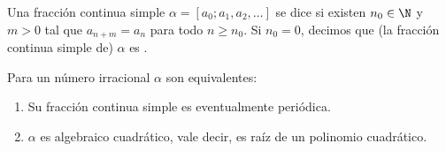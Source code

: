 \documentclass[teoria-numeros.tex]{subfiles}
\begin{document}
\begin{mydef}
	Una fracción continua simple $\alpha = [a_0; a_1, a_2, \dots]$ se dice 
	si existen $n_0 \in \N$ y $m > 0$ tal que $a_{n + m} = a_n$ para todo $n \ge n_0$.
	Si $n_0 = 0$, decimos que (la fracción continua simple de) $\alpha$ es .
\end{mydef}
\begin{thm}
	Para un número irracional $\alpha$ son equivalentes:
	\begin{enumerate}
		\item Su fracción continua simple es eventualmente periódica.
		\item $\alpha$ es algebraico cuadrático, vale decir, es raíz de un polinomio cuadrático.
	\end{enumerate}
\end{thm}
\end{document}
